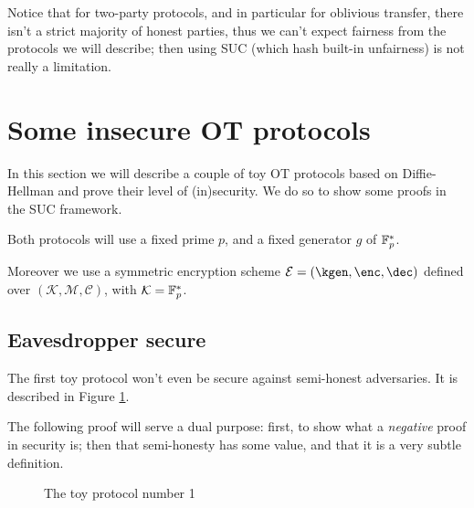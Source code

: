Notice that for two-party protocols, and in particular for oblivious transfer, there isn't a strict majority of honest parties, thus we can't expect fairness from the protocols we will describe; then using SUC (which hash built-in unfairness) is not really a limitation.

\section{Some insecure OT protocols}\label{section_dummy}
In this section we will describe a couple of toy OT protocols based on Diffie-Hellman and prove their level of (in)security. We do so to show some proofs in the SUC framework.

Both protocols will use a fixed prime $p$, and a fixed generator $g$ of $\mathbb{F}_p^\ast$.

Moreover we use a symmetric encryption scheme $\mathcal{E}=(\kgen, \enc, \dec)$ defined over $(\mathcal{K, M, C})$, with $\mathcal{K}=\mathbb{F}_p^\ast$.

\subsection{Eavesdropper secure}
The first toy protocol won't even be secure against semi-honest adversaries. It is described in Figure \ref{prot_dummy_1}.

The following proof will serve a dual purpose: first, to show what a \emph{negative} proof in security is; then that semi-honesty has some value, and that it is a very subtle definition.

\begin{figure}
    \caption{The toy protocol number 1}
    \label{prot_dummy_1}
\end{figure}

